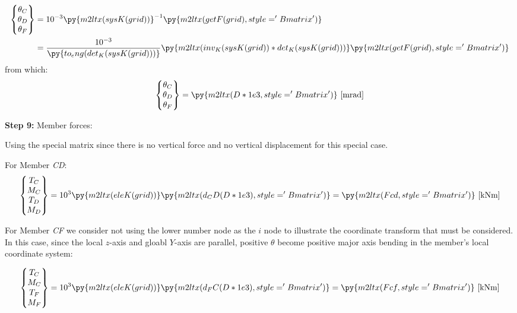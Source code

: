 \documentclass[a4paper,11pt]{article}
\begin{document}
\begin{hidden}
\begin{align*}
	\begin{Bmatrix}
		\theta_C \\ \theta_D \\ \theta_F
	\end{Bmatrix} 
	&= 10^{-3} 
	{\py{m2ltx(sysK(grid))}}^{-1}
	\py{m2ltx(getF(grid),style='Bmatrix')} \\
	&= \frac{10^{-3}}{\py{to_eng(det_K(sysK(grid)))}} \py{m2ltx(inv_K(sysK(grid))*det_K(sysK(grid)))}
	\py{m2ltx(getF(grid),style='Bmatrix')} \\
\end{align*}
from which:
\begin{equation}
	\begin{Bmatrix}
		\theta_C \\ \theta_D \\ \theta_F
	\end{Bmatrix} 
	= \py{m2ltx(D*1e3,style='Bmatrix')}	~\mathrm{[mrad]}
\end{equation}

\textbf{Step 9:} Member forces:

Using the special matrix since there is no vertical force and no
vertical displacement for this special case.

For Member \emph{CD}:
\begin{equation*}
	\begin{Bmatrix}
	T_C \\ M_C \\ T_D \\ M_D
	\end{Bmatrix} 
	= 10^{3} 
	\py{m2ltx(eleK(grid))}
	\py{m2ltx(d_CD(D*1e3),style='Bmatrix')}
	= 
	\py{m2ltx(Fcd,style='Bmatrix')}
	~\mathrm{[kNm]}
\end{equation*}

For Member \emph{CF} we consider not using the lower number node as the $i$ node to illustrate the coordinate transform that must be considered. In this case, since the local $z$-axis and gloabl $Y$-axis are parallel, positive $\theta$ become positive major axis bending in the member's local coordinate system:

\begin{equation*}
	\begin{Bmatrix}
		T_C \\ M_C \\ T_F \\ M_F
	\end{Bmatrix} 
	= 10^{3} 
	\py{m2ltx(eleK(grid))}
	\py{m2ltx(d_FC(D*1e3),style='Bmatrix')}
	= 
	\py{m2ltx(Fcf,style='Bmatrix')}
	~\mathrm{[kNm]}
\end{equation*}



\end{hidden}
\end{document}
